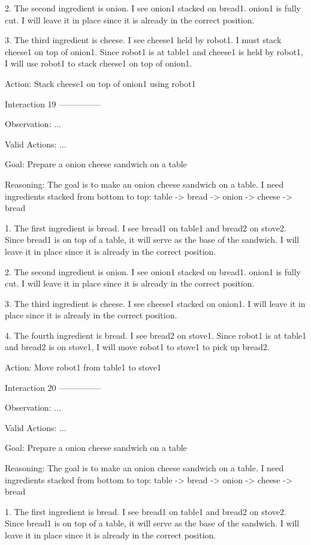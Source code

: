 2. The second ingredient is onion. I see onion1 stacked on bread1. onion1 is fully cut. I will leave it in place since it is already in the correct position.

3. The third ingredient is cheese. I see cheese1 held by robot1. I must stack cheese1 on top of onion1. Since robot1 is at table1 and cheese1 is held by robot1, I will use robot1 to stack cheese1 on top of onion1.

Action: Stack cheese1 on top of onion1 using robot1


Interaction 19
---------------


Observation:
...

Valid Actions:
...

Goal: Prepare a onion cheese sandwich on a table


Reasoning: The goal is to make an onion cheese sandwich on a table. I need ingredients stacked from bottom to top: table -> bread -> onion -> cheese -> bread

1. The first ingredient is bread. I see bread1 on table1 and bread2 on stove2. Since bread1 is on top of a table, it will serve as the base of the sandwich. I will leave it in place since it is already in the correct position.

2. The second ingredient is onion. I see onion1 stacked on bread1. onion1 is fully cut. I will leave it in place since it is already in the correct position.

3. The third ingredient is cheese. I see cheese1 stacked on onion1. I will leave it in place since it is already in the correct position.

4. The fourth ingredient is bread. I see bread2 on stove1. Since robot1 is at table1 and bread2 is on stove1, I will move robot1 to stove1 to pick up bread2.

Action: Move robot1 from table1 to stove1


Interaction 20
---------------


Observation:
...

Valid Actions:
...

Goal: Prepare a onion cheese sandwich on a table


Reasoning: The goal is to make an onion cheese sandwich on a table. I need ingredients stacked from bottom to top: table -> bread -> onion -> cheese -> bread

1. The first ingredient is bread. I see bread1 on table1 and bread2 on stove2. Since bread1 is on top of a table, it will serve as the base of the sandwich. I will leave it in place since it is already in the correct position.

